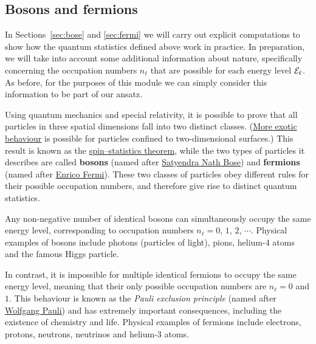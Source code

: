 \subsection{\label{sec:spin}Bosons and fermions}
In Sections~\ref{sec:bose} and \ref{sec:fermi} we will carry out explicit computations to show how the quantum statistics defined above work in practice.
In preparation, we will take into account some additional information about nature, specifically concerning the occupation numbers $n_{\ell}$ that are possible for each energy level $\mathcal E_{\ell}$.
As before, for the purposes of this module we can simply consider this information to be part of our ansatz.

Using quantum mechanics and special relativity, it is possible to prove that all particles in three spatial dimensions fall into two distinct classes.
(\href{https://en.wikipedia.org/wiki/Anyon}{More exotic behaviour} is possible for particles confined to two-dimensional surfaces.)
This result is known as the \href{https://en.wikipedia.org/wiki/Spin-statistics_theorem}{spin--statistics theorem}, while the two types of particles it describes are called \textbf{bosons} (named after \href{https://en.wikipedia.org/wiki/Satyendra_Nath_Bose}{Satyendra Nath Bose}) and \textbf{fermions} (named after \href{https://en.wikipedia.org/wiki/Enrico_Fermi}{Enrico Fermi}).
These two classes of particles obey different rules for their possible occupation numbers, and therefore give rise to distinct quantum statistics.

Any non-negative number of identical bosons can simultaneously occupy the same energy level, corresponding to occupation numbers $n_{\ell} = 0$, $1$, $2$, $\cdots$.
Physical examples of bosons include photons (particles of light), pions, helium-$4$ atoms and the famous Higgs particle.

In contrast, it is impossible for multiple identical fermions to occupy the same energy level, meaning that their only possible occupation numbers are $n_{\ell} = 0$ and $1$.
This behaviour is known as the \textit{Pauli exclusion principle} (named after \href{https://en.wikipedia.org/wiki/Wolfgang_Pauli}{Wolfgang Pauli}) and has extremely important consequences, including the existence of chemistry and life.
Physical examples of fermions include electrons, protons, neutrons, neutrinos and helium-$3$ atoms.

